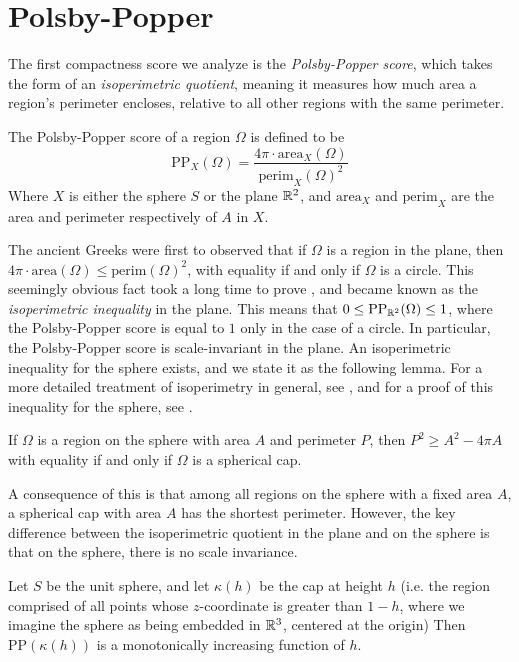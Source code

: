 \section{Polsby-Popper}\label{sec:pp}
The first compactness score we analyze is the \textit{Polsby-Popper
score}, which takes the form of an \textit{isoperimetric quotient},
meaning it measures how much area a region's perimeter encloses,
relative to all other regions with the same perimeter.

\begin{definition}\label{def:pp}
  The Polsby-Popper score of a region $\Omega$ is defined to be
  $$\mathrm{PP}_X(\Omega) = \frac{4\pi
  \cdot\mathrm{area}_X(\Omega)}{\mathrm{perim}_X(\Omega)^2}$$ 
  Where $X$ is either the sphere $S$ or the plane $\mathbb{R}^2$, and
  $\mathrm{area}_X$ and $\mathrm{perim}_X$ are the area and perimeter
  respectively of $A$ in $X$.
\end{definition}

The ancient Greeks were first to observed that if $\Omega$ is a region
in the plane, then $4\pi\cdot\mathrm{area}(\Omega)\leq
\mathrm{perim}(\Omega)^2$, with equality if and only if $\Omega$ is
a circle. This seemingly obvious fact took a long time to prove%
, and became known as the \textit{isoperimetric inequality} in
the plane.  This means that $0\le \mathrm{PP}_{\mathbb{R}^2}(\Omega)\le 1$,
where the Polsby-Popper score is equal to $1$ only in the case of
a circle. In particular, the Polsby-Popper score is scale-invariant in
the plane. An isoperimetric inequality for the sphere exists, and we
state it as the following lemma.  For a more detailed treatment of
isoperimetry in general, see \cite{osserman1979bonnesen}, and for
a proof of this inequality for the sphere, see \cite{rado}.

\begin{lemma}
  If $\Omega$ is a region on the  sphere with area
  $A$ and perimeter $P$, then $P^2\geq A^2-4\pi A$ with equality if
  and only if $\Omega$ is a spherical cap.
\end{lemma}
A consequence of this is that among all regions on the sphere with
a fixed area $A$, a spherical cap with area $A$ has the shortest
perimeter. However, the key difference between the isoperimetric 
quotient in the plane and on the sphere is that on the 
sphere, there is no scale invariance.


\begin{lemma}\label{lem:ppscale}
  Let $S$ be the unit sphere, and let $\kappa(h)$ be the cap at height
  $h$ (i.e. the region comprised of all points whose $z$-coordinate is
  greater than $1-h$, where we imagine the sphere as being embedded in
  $\mathbb{R}^3$, centered at the origin) Then $\mathrm{PP}(\kappa(h))$ is
  a monotonically increasing function of $h$.
\end{lemma}



